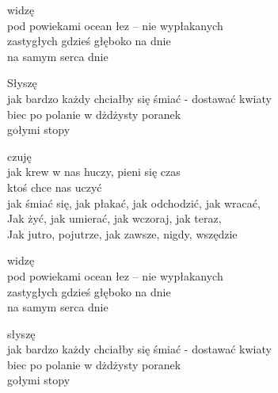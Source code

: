 \begin{text}
    widzę\\
    pod powiekami ocean łez – nie wypłakanych\\
    zastygłych gdzieś głęboko na dnie\\
    na samym serca dnie

    Słyszę\\
    jak bardzo każdy chciałby się śmiać - dostawać kwiaty\\
    biec po polanie w dżdżysty poranek\\
    gołymi stopy


    czuję\\
    jak krew w nas huczy, pieni się czas\\
    ktoś chce nas uczyć\\
    jak śmiać się, jak płakać, jak odchodzić, jak wracać,\\
    Jak żyć, jak umierać, jak wczoraj, jak teraz,\\
    Jak jutro, pojutrze, jak zawsze, nigdy, wszędzie


    widzę\\
    pod powiekami ocean łez – nie wypłakanych\\
    zastygłych gdzieś głęboko na dnie\\
    na samym serca dnie

    słyszę\\
    jak bardzo każdy chciałby się śmiać - dostawać kwiaty\\
    biec po polanie w dżdżysty poranek\\
    gołymi stopy

\end{text}
